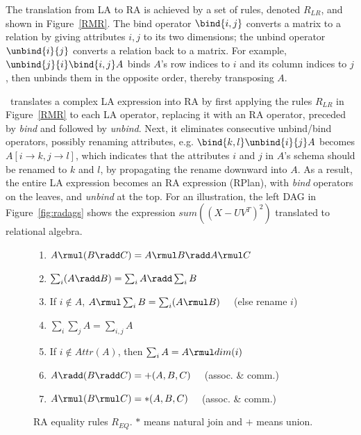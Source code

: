The translation from LA to RA is achieved by a set of rules, denoted
$R_{LR}$, and shown in Figure~\ref{RMR}. The bind operator
$\bind{i,j}$ converts a matrix to a relation by giving attributes
$i,j$ to its two dimensions; the unbind operator $\unbind{i}{j}$
converts a relation back to a matrix. For example,
$\unbind{j}{i}\bind{i,j}A$ binds $A$'s row indices to $i$ and its
column indices to $j$, then unbinds them in the opposite order,
thereby transposing $A$.

\sys\ translates a complex LA expression into RA by first applying the
rules $R_{LR}$ in Figure~\ref{RMR} to each LA operator, replacing it
with an RA operator, preceded by {\em bind} and followed by {\em
  unbind}. Next, it eliminates consecutive unbind/bind operators,
possibly renaming attributes, e.g.  $\bind{k,l} \unbind{i}{j} A$
becomes $A[i \to k, j \to l]$, which indicates that the attributes $i$
and $j$ in $A$'s schema should be renamed to $k$ and $l$, by
propagating the rename downward into $A$.  As a result, the entire LA
expression becomes an RA expression (RPlan), with {\em bind} operators
on the leaves, and {\em unbind} at the top.
For an illustration, the left DAG in Figure~\ref{fig:radags} shows the
expression $sum((X - UV^T)^2)$ translated to relational algebra.

\begin{figure}
\centering
\begin{minipage}{0.6\textwidth}
\begin{enumerate}
  \item\label{RRC_mp} $A \rmul (B \radd C) = A \rmul B \radd A \rmul C$
  \item\label{RRC_ap} $\sum_i (A \radd B) = \sum_i A \radd \sum_i B$
  \item\label{RRC_ma} If $i \not\in A$, $A \rmul \sum_i B = \sum_i (A \rmul B)
    \quad$ (else rename $i$)
  \item\label{RRC_aa} $\sum_i \sum_j A = \sum_{i,j} A$
  \item\label{RRC_ac} If $i \not\in Attr(A)$, then $\sum_i A = A \rmul dim(i)$
  \item\label{RRC_pp} $A \radd (B \radd C) = +(A, B, C) \quad$ (assoc. \& comm.)
  \item\label{RRC_mm} $A \rmul (B \rmul C) = *(A, B, C) \quad$ (assoc. \& comm.)
\end{enumerate}
\end{minipage}
\caption{RA equality rules $R_{EQ}$. $*$ means natural join and $+$ means
  union.}
\label{RRC}
\end{figure}


